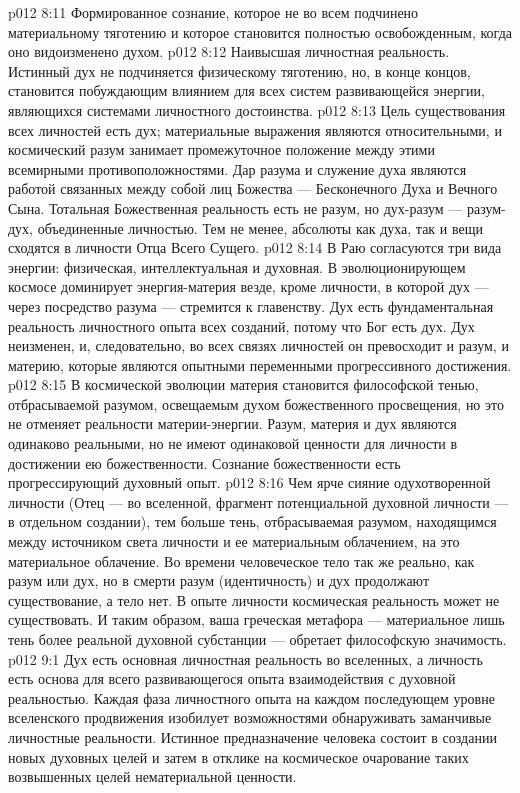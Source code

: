 \vs p012 8:11 \bibnobreakspace {} Формированное сознание, которое не во всем подчинено материальному тяготению и которое становится полностью освобожденным, когда оно видоизменено духом.
\vs p012 8:12 \bibnobreakspace {} Наивысшая личностная реальность. Истинный дух не подчиняется физическому тяготению, но, в конце концов, становится побуждающим влиянием для всех систем развивающейся энергии, являющихся системами личностного достоинства.
\vs p012 8:13 \pc Цель существования всех личностей есть дух; материальные выражения являются относительными, и космический разум занимает промежуточное положение между этими всемирными противоположностями. Дар разума и служение духа являются работой связанных между собой лиц Божества --- Бесконечного Духа и Вечного Сына. Тотальная Божественная реальность есть не разум, но дух\hyp{}разум --- разум\hyp{}дух, объединенные личностью. Тем не менее, абсолюты как духа, так и вещи сходятся в личности Отца Всего Сущего.
\vs p012 8:14 \pc В Раю согласуются три вида энергии: физическая, интеллектуальная и духовная. В эволюционирующем космосе доминирует энергия\hyp{}материя везде, кроме личности, в которой дух --- через посредство разума --- стремится к главенству. Дух есть фундаментальная реальность личностного опыта всех созданий, потому что Бог есть дух. Дух неизменен, и, следовательно, во всех связях личностей он превосходит и разум, и материю, которые являются опытными переменными прогрессивного достижения.
\vs p012 8:15 В космической эволюции материя становится философской тенью, отбрасываемой разумом, освещаемым духом божественного просвещения, но это не отменяет реальности материи\hyp{}энергии. Разум, материя и дух являются одинаково реальными, но не имеют одинаковой ценности для личности в достижении ею божественности. Сознание божественности есть прогрессирующий духовный опыт.
\vs p012 8:16 Чем ярче сияние одухотворенной личности (Отец --- во вселенной, фрагмент потенциальной духовной личности --- в отдельном создании), тем больше тень, отбрасываемая разумом, находящимся между источником света личности и ее материальным облачением, на это материальное облачение. Во времени человеческое тело так же реально, как разум или дух, но в смерти разум (идентичность) и дух продолжают существование, а тело нет. В опыте личности космическая реальность может не существовать. И таким образом, ваша греческая метафора --- материальное лишь тень более реальной духовной субстанции --- обретает философскую значимость.
\vs p012 9:1 Дух есть основная личностная реальность во вселенных, а личность есть основа для всего развивающегося опыта взаимодействия с духовной реальностью. Каждая фаза личностного опыта на каждом последующем уровне вселенского продвижения изобилует возможностями обнаруживать заманчивые личностные реальности. Истинное предназначение человека состоит в создании новых духовных целей и затем в отклике на космическое очарование таких возвышенных целей нематериальной ценности.
